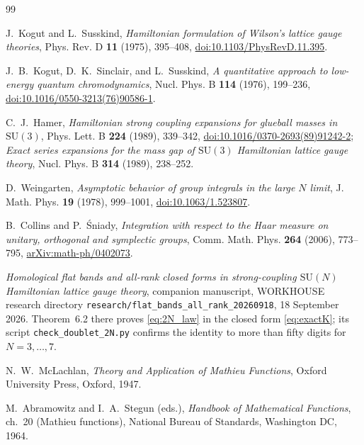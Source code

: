 \documentclass[11pt,a4paper]{article}
\theoremstyle{definition}
\newcommand{\SU}{\mathrm{SU}}
\begin{document}
\begin{thebibliography}{99}

J.~Kogut and L.~Susskind,
\emph{Hamiltonian formulation of Wilson's lattice gauge theories},
Phys. Rev. D \textbf{11} (1975), 395--408,
\href{https://doi.org/10.1103/PhysRevD.11.395}{doi:10.1103/PhysRevD.11.395}.

J.~B.~Kogut, D.~K.~Sinclair, and L.~Susskind,
\emph{A quantitative approach to low-energy quantum chromodynamics},
Nucl. Phys. B \textbf{114} (1976), 199--236,
\href{https://doi.org/10.1016/0550-3213(76)90586-1}{doi:10.1016/0550-3213(76)90586-1}.

C.~J.~Hamer,
\emph{Hamiltonian strong coupling expansions for glueball masses in $\SU(3)$},
Phys. Lett. B \textbf{224} (1989), 339--342,
\href{https://doi.org/10.1016/0370-2693(89)91242-2}{doi:10.1016/0370-2693(89)91242-2};
\emph{Exact series expansions for the mass gap of $\SU(3)$ Hamiltonian lattice gauge theory},
Nucl. Phys. B \textbf{314} (1989), 238--252.

D.~Weingarten,
\emph{Asymptotic behavior of group integrals in the large $N$ limit},
J. Math. Phys. \textbf{19} (1978), 999--1001,
\href{https://doi.org/10.1063/1.523807}{doi:10.1063/1.523807}.

B.~Collins and P.~\'Sniady,
\emph{Integration with respect to the Haar measure on unitary, orthogonal and symplectic groups},
Comm. Math. Phys. \textbf{264} (2006), 773--795,
\href{https://arxiv.org/abs/math-ph/0402073}{arXiv:math-ph/0402073}.

\emph{Homological flat bands and all-rank closed forms in strong-coupling $\SU(N)$ Hamiltonian lattice gauge theory},
companion manuscript, WORKHOUSE research directory
\texttt{research/flat\_bands\_all\_rank\_20260918}, 18 September 2026.
Theorem~6.2 there proves \eqref{eq:2N_law} in the closed form \eqref{eq:exactK};
its script \texttt{check\_doublet\_2N.py} confirms the identity to more than
fifty digits for $N = 3,\dots,7$.

N.~W.~McLachlan,
\emph{Theory and Application of Mathieu Functions},
Oxford University Press, Oxford, 1947.

M.~Abramowitz and I.~A.~Stegun (eds.),
\emph{Handbook of Mathematical Functions}, ch.~20 (Mathieu functions),
National Bureau of Standards, Washington DC, 1964.


\end{thebibliography}
\end{document}
